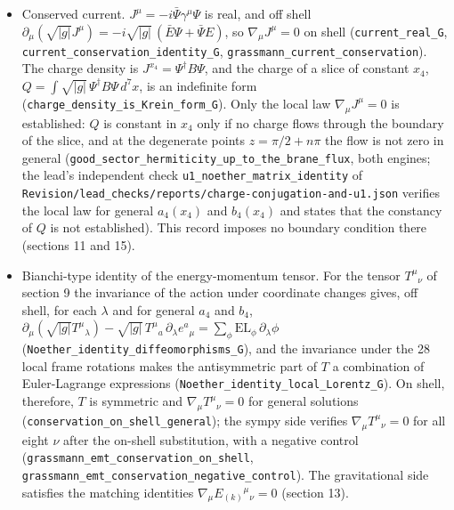 \documentclass[11pt]{article}
\begin{document}
\begin{itemize}
\item Conserved current. $J^\mu = -i\bar\Psi\gamma^\mu\Psi$ is real, and off shell $\partial_\mu(\sqrt{|g|}J^\mu) = -i\sqrt{|g|}\,(\bar E\Psi + \bar\Psi E)$, so $\nabla_\mu J^\mu = 0$ on shell (\texttt{current\_\allowbreak{}real\_G}, \texttt{current\_\allowbreak{}conserva\allowbreak{}tion\_ide\allowbreak{}ntity\_G}, \texttt{grassman\allowbreak{}n\_curren\allowbreak{}t\_conser\allowbreak{}vation}). The charge density is $J^{x_4} = \Psi^\dagger B\Psi$, and the charge of a slice of constant $x_4$, $Q = \int\sqrt{|g|}\,\Psi^\dagger B\Psi\,d^7x$, is an indefinite form (\texttt{charge\_d\allowbreak{}ensity\_i\allowbreak{}s\_Krein\_\allowbreak{}form\_G}). Only the local law $\nabla_\mu J^\mu = 0$ is established: $Q$ is constant in $x_4$ only if no charge flows through the boundary of the slice, and at the degenerate points $z = \pi/2 + n\pi$ the flow is not zero in general (\texttt{good\_sec\allowbreak{}tor\_herm\allowbreak{}iticity\_\allowbreak{}up\_to\_th\allowbreak{}e\_brane\_\allowbreak{}flux}, both engines; the lead's independent check \texttt{u1\_noeth\allowbreak{}er\_matri\allowbreak{}x\_identi\allowbreak{}ty} of \texttt{Revision\allowbreak{}/lead\_ch\allowbreak{}ecks/rep\allowbreak{}orts/cha\allowbreak{}rge-conj\allowbreak{}ugation-\allowbreak{}and-u1.j\allowbreak{}son} verifies the local law for general $a_4(x_4)$ and $b_4(x_4)$ and states that the constancy of $Q$ is not established). This record imposes no boundary condition there (sections 11 and 15).
\item Bianchi-type identity of the energy-momentum tensor. For the tensor $T^\mu{}_\nu$ of section 9 the invariance of the action under coordinate changes gives, off shell, for each $\lambda$ and for general $a_4$ and $b_4$, $\partial_\mu(\sqrt{|g|}T^\mu{}_\lambda) - \sqrt{|g|}\,T^\mu{}_a\,\partial_\lambda e^a{}_\mu = \sum_\phi \mathrm{EL}_\phi\,\partial_\lambda\phi$ (\texttt{Noether\_\allowbreak{}identity\allowbreak{}\_diffeom\allowbreak{}orphisms\allowbreak{}\_G}), and the invariance under the 28 local frame rotations makes the antisymmetric part of $T$ a combination of Euler-Lagrange expressions (\texttt{Noether\_\allowbreak{}identity\allowbreak{}\_local\_L\allowbreak{}orentz\_G}). On shell, therefore, $T$ is symmetric and $\nabla_\mu T^\mu{}_\nu = 0$ for general solutions (\texttt{conserva\allowbreak{}tion\_on\_\allowbreak{}shell\_ge\allowbreak{}neral}); the sympy side verifies $\nabla_\mu T^\mu{}_\nu = 0$ for all eight $\nu$ after the on-shell substitution, with a negative control (\texttt{grassman\allowbreak{}n\_emt\_co\allowbreak{}nservati\allowbreak{}on\_on\_sh\allowbreak{}ell}, \texttt{grassman\allowbreak{}n\_emt\_co\allowbreak{}nservati\allowbreak{}on\_negat\allowbreak{}ive\_cont\allowbreak{}rol}). The gravitational side satisfies the matching identities $\nabla_\mu E_{(k)}{}^\mu{}_\nu = 0$ (section 13).

\end{itemize}
\end{document}
